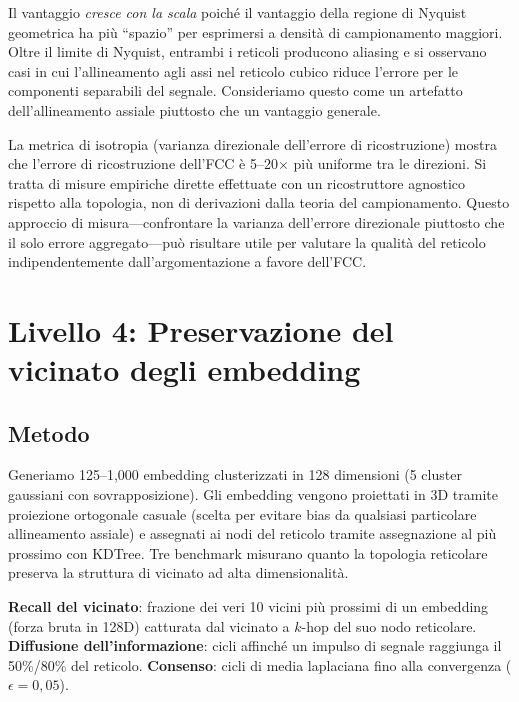 \documentclass[11pt]{article}
\begin{document}
Il vantaggio \emph{cresce con la scala} poich\'e il vantaggio della
regione di Nyquist geometrica ha pi\`u ``spazio'' per esprimersi a
densit\`a di campionamento maggiori. Oltre il limite di Nyquist,
entrambi i reticoli producono aliasing e si osservano casi in cui
l'allineamento agli assi nel reticolo cubico riduce l'errore per le
componenti separabili del segnale. Consideriamo questo come un artefatto
dell'allineamento assiale piuttosto che un vantaggio generale.

La metrica di isotropia (varianza direzionale dell'errore di ricostruzione)
mostra che l'errore di ricostruzione dell'FCC \`e 5--20$\times$ pi\`u
uniforme tra le direzioni. Si tratta di misure empiriche dirette
effettuate con un ricostruttore agnostico rispetto alla topologia, non
di derivazioni dalla teoria del campionamento. Questo approccio di
misura---confrontare la varianza dell'errore direzionale piuttosto che il
solo errore aggregato---pu\`o risultare utile per valutare la qualit\`a
del reticolo indipendentemente dall'argomentazione a favore dell'FCC.

\section{Livello 4: Preservazione del vicinato degli embedding}
\label{sec:embed}

\subsection{Metodo}

Generiamo 125--1{,}000 embedding clusterizzati in 128 dimensioni
(5 cluster gaussiani con sovrapposizione). Gli embedding vengono proiettati
in 3D tramite proiezione ortogonale casuale (scelta per evitare bias da
qualsiasi particolare allineamento assiale) e assegnati ai nodi del
reticolo tramite assegnazione al pi\`u prossimo con KDTree. Tre benchmark
misurano quanto la topologia reticolare preserva la struttura di vicinato
ad alta dimensionalit\`a.

\textbf{Recall del vicinato}: frazione dei veri 10 vicini pi\`u prossimi
di un embedding (forza bruta in 128D) catturata dal vicinato a $k$-hop del
suo nodo reticolare. \textbf{Diffusione dell'informazione}: cicli
affinch\'e un impulso di segnale raggiunga il 50\%/80\% del reticolo.
\textbf{Consenso}: cicli di media laplaciana fino alla convergenza
($\epsilon = 0{,}05$).
\end{document}
